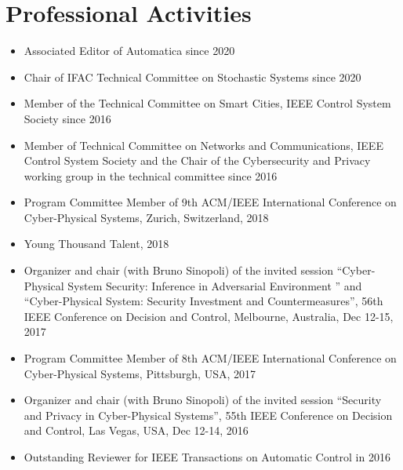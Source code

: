 \documentclass[10pt, a4paper]{article}
\begin{document}
\section*{Professional Activities}
\begin{itemize}
\item Associated Editor of Automatica since 2020\\

\item Chair of IFAC Technical Committee on Stochastic Systems since 2020\\

\item Member of the Technical Committee on Smart Cities, IEEE Control System Society since 2016\\

\item Member of Technical Committee on Networks and Communications, IEEE Control System Society and the Chair of the Cybersecurity and Privacy working group in the technical committee since 2016\\

\item Program Committee Member of 9th ACM/IEEE International Conference on Cyber-Physical Systems, Zurich, Switzerland, 2018\\

\item Young Thousand Talent, 2018

\item Organizer and chair (with Bruno Sinopoli) of the invited session “Cyber-Physical System Security: Inference in Adversarial Environment
” and “Cyber-Physical System: Security Investment and Countermeasures”, 56th IEEE Conference on Decision and Control, Melbourne, Australia, Dec 12-15, 2017\\

\item Program Committee Member of 8th ACM/IEEE International Conference on Cyber-Physical Systems, Pittsburgh, USA, 2017\\

\item Organizer and chair (with Bruno Sinopoli) of the invited session “Security and Privacy in Cyber-Physical Systems”, 55th IEEE Conference on Decision and Control, Las Vegas, USA, Dec 12-14, 2016\\

\item Outstanding Reviewer for IEEE Transactions on Automatic Control in 2016


\end{itemize}
\end{document}
